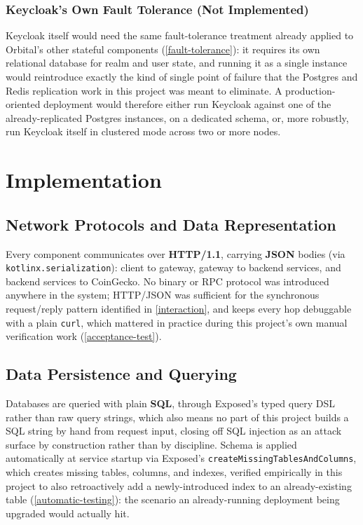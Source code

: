 \documentclass{scrartcl}
\begin{document}
\subsubsection{Keycloak's Own Fault Tolerance (Not Implemented)}\label{security-keycloak-ha}

Keycloak itself would need the same fault-tolerance treatment already applied to Orbital's other
stateful components (\cref{fault-tolerance}): it requires its own relational database for realm
and user state, and running it as a single instance would reintroduce exactly the kind of single
point of failure that the Postgres and Redis replication work in this project was meant to
eliminate. A production-oriented deployment would therefore either run Keycloak against one of the
already-replicated Postgres instances, on a dedicated schema, or, more robustly, run Keycloak
itself in clustered mode across two or more nodes.

\section{Implementation}\label{implementation}

\subsection{Network Protocols and Data Representation}\label{impl-network}

Every component communicates over \textbf{HTTP/1.1}, carrying \textbf{JSON} bodies (via
\texttt{kotlinx.serialization}): client to gateway, gateway to backend services, and backend
services to CoinGecko. No binary or RPC protocol was introduced anywhere in the system; HTTP/JSON
was sufficient for the synchronous request/reply pattern identified in \cref{interaction}, and
keeps every hop debuggable with a plain \texttt{curl}, which mattered in practice during this
project's own manual verification work (\cref{acceptance-test}).

\subsection{Data Persistence and Querying}\label{impl-persistence}

Databases are queried with plain \textbf{SQL}, through Exposed's typed query DSL rather than raw
query strings, which also means no part of this project builds a SQL string by hand from request
input, closing off SQL injection as an attack surface by construction rather than by discipline.
Schema is applied automatically at service startup via Exposed's
\texttt{createMissingTablesAndColumns}, which creates missing tables, columns, and indexes,
verified empirically in this project to also retroactively add a newly-introduced index to an
already-existing table (\cref{automatic-testing}): the scenario an already-running deployment
being upgraded would actually hit.
\end{document}
